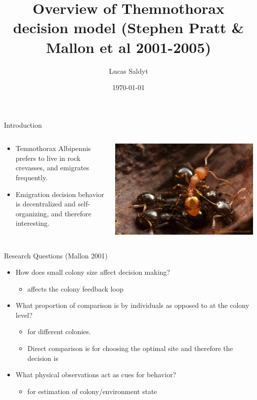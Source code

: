 \documentclass{beamer}
\title{Overview of Themnothorax decision model (Stephen Pratt \& Mallon et al 2001-2005)}
\date{\today}
\author{Lucas Saldyt}
\institute{Arizona State University}
\makeatletter
\def\mcolor#1#{\@mcolor{#1}}
\def\@mcolor#1#2#3{%
  \protect\leavevmode
  \begingroup
    \color#1{#2}#3%
  \endgroup
}
\newcommand{\sitem}[1]
{
    \begin{itemize}
        \item #1
    \end{itemize}
}
\makeatother
\begin{document}
  \maketitle
  \begin{frame}{Introduction}
      \begin{columns}
          \begin{column}{0.5\textwidth}
              \begin{itemize}
                  \item Temnothorax Albipennis prefers to live in rock crevasses, and emigrates frequently.
                  \item Emigration decision behavior is decentralized and self-organizing, and therefore interesting.
              \end{itemize}
          \end{column}
          \begin{column}{0.5\textwidth}
               \includegraphics[scale=1.0]{americanus}
          \end{column}
      \end{columns}
  \end{frame}

  \begin{frame}{Research Questions (Mallon 2001)}
      \begin{itemize}
          \item How does small colony size affect decision making?
              \sitem{ affects the colony feedback loop}
          \item What proportion of comparison is by individuals as opposed to at the colony level? 
          \sitem{ for different colonies.}
          \sitem{Direct comparison is  for choosing the optimal site and therefore the decision is \mcolor{red}{decentralized}}
          \item What physical observations act as cues for behavior? 
              \sitem{ for estimation of colony/environment state}
      \end{itemize}
  \end{frame}
\end{document}
